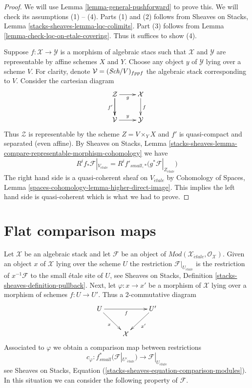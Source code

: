 \begin{proof}
We will use
Lemma \ref{lemma-general-pushforward}
to prove this. We will check its assumptions (1) -- (4).
Parts (1) and (2) follows from
Sheaves on Stacks, Lemma \ref{stacks-sheaves-lemma-lqc-colimits}.
Part (3) follows from
Lemma \ref{lemma-check-lqc-on-etale-covering}.
Thus it suffices to show (4).

\medskip\noindent
Suppose $f : \mathcal{X} \to \mathcal{Y}$ is a morphism of algebraic stacs
such that $\mathcal{X}$ and $\mathcal{Y}$ are representable by affine
schemes $X$ and $Y$. Choose any object $y$ of $\mathcal{Y}$ lying over a
scheme $V$. For clarity, denote $\mathcal{V} = (\textit{Sch}/V)_{fppf}$ the
algebraic stack corresponding to $V$. Consider the cartesian diagram
$$
\xymatrix{
\mathcal{Z} \ar[d] \ar[r]_g \ar[d]_{f'} & \mathcal{X} \ar[d]^f \\
\mathcal{V} \ar[r]^y & \mathcal{Y}
}
$$
Thus $\mathcal{Z}$ is representable by the scheme $Z = V \times_Y X$
and $f'$ is quasi-compact and separated (even affine). By
Sheaves on Stacks, Lemma
\ref{stacks-sheaves-lemma-compare-representable-morphism-cohomology}
we have
$$
R^if_*\mathcal{F}|_{V_{\acute{e}tale}} =
R^if'_{small, *}\big(g^*\mathcal{F}|_{Z_{\acute{e}tale}}\big)
$$
The right hand side is a quasi-coherent sheaf on $V_{\acute{e}tale}$ by
Cohomology of Spaces, Lemma
\ref{spaces-cohomology-lemma-higher-direct-image}.
This implies the left hand side is quasi-coherent which is what
we had to prove.
\end{proof}







\section{Flat comparison maps}
\label{section-flat-comparison}

\noindent
Let $\mathcal{X}$ be an algebraic stack and let $\mathcal{F}$ be an object
of $\textit{Mod}(\mathcal{X}_{\acute{e}tale}, \mathcal{O}_\mathcal{X})$.
Given an object $x$ of $\mathcal{X}$ lying over the scheme $U$ the
restriction $\mathcal{F}|_{U_{\acute{e}tale}}$ is the restriction of
$x^{-1}\mathcal{F}$ to the small \'etale site of $U$, see
Sheaves on Stacks, Definition \ref{stacks-sheaves-definition-pullback}.
Next, let $\varphi : x \to x'$ be a morphism of $\mathcal{X}$ lying
over a morphism of schemes $f : U \to U'$. Thus a $2$-commutative diagram
$$
\xymatrix{
U \ar[rd]_x \ar[rr]_f & & U' \ar[ld]^{x'} \\
& \mathcal{X}
}
$$
Associated to $\varphi$ we obtain a comparison map between restrictions
\begin{equation}
\label{equation-comparison-modules}
c_\varphi :
f_{small}^*(\mathcal{F}|_{U'_{\acute{e}tale}})
\longrightarrow
\mathcal{F}|_{U_{\acute{e}tale}}
\end{equation}
see Sheaves on Stacks, Equation
(\ref{stacks-sheaves-equation-comparison-modules}).
In this situation we can consider the following property
of $\mathcal{F}$.

